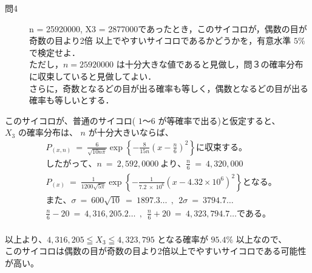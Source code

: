 \documentclass[12pt,a4paper]{jsarticle}
\begin{document}
\begin{description}
    \item [問4] n = 25920000, X3 = 2877000であったとき，このサイコロが，偶数の目が奇数の目より2倍
    以上でやすいサイコロであるかどうかを，有意水準 $ 5{\%} $ で検定せよ．\\
    ただし，$ n = 25920000 $ は十分大きな値であると見做し，問３の確率分布に収束していると見做してよい．\\
    さらに，奇数となるどの目が出る確率も等しく，偶数となるどの目が出る確率も等しいとする．
\end{description}

このサイコロが、普通のサイコロ( $ 1 〜 6 $ が等確率で出る)と仮定すると、\\
$ X_{3} $ の確率分布は、 $ n $ が十分大きいならば、\\

\begin{align*}
    &P_{(x,n)} ~=~ \frac{6}{\sqrt{10n{\pi}}} \exp\left\{ -\frac{8}{15n}\left(x - \frac{n}{6}\right)^2  \right\}に収束する。\\
    &したがって、n ~=~ 2,592,0000~より、\frac{n}{6} ~=~ 4,320,000 \\
    &P_{(x)} ~=~ \frac{1}{1200\sqrt{5\pi}}\exp\left\{ -\frac{1}{7.2~×~10^6}\left(x-4.32×10^6\right)^2 \right\} となる。\\
    &また、\sigma ~=~ 600\sqrt{10} ~=~ 1897.3\dots ~~,~~ 2\sigma ~=~ 3794.7\dots \\
    &\frac{n}{6}-20 ~=~ 4,316,205.2\dots ~~,~~ \frac{n}{6}+20 ~=~ 4,323,794.7\dots である。\\
\end{align*}

以上より、$ 4,316,205 \leqq X_{3} \leqq 4,323,795 $ となる確率が $ 95.4\% $ 以上なので、\\
このサイコロは偶数の目が奇数の目より2倍以上でやすいサイコロである可能性が高い。\\
\end{document}

